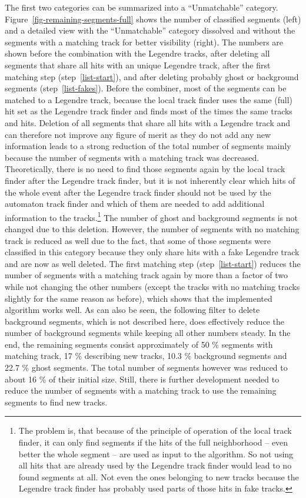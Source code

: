 The first two categories can be summarized into a ``Unmatchable'' category. Figure~\ref{fig-remaining-segments-full} shows the number of classified segments (left) and a detailed view with the ``Unmatchable'' category dissolved and without the segments with a matching track for better visibility (right). The numbers are shown before the combination with the Legendre tracks, after deleting all segments that share all hits with an unique Legendre track, after the first matching step (step~\ref{list-start}), and after deleting probably ghost or background segments (step~\ref{list-fakes}). Before the combiner, most of the segments can be matched to a Legendre track, because the local track finder uses the same (full) hit set as the Legendre track finder and finds most of the times the same tracks and hits. Deletion of all segments that share all hits with a Legendre track and can therefore not improve any figure of merit as they do not add any new information leads to a strong reduction of the total number of segments mainly because the number of segments with a matching track was decreased. Theoretically, there is no need to find those segments again by the local track finder after the Legendre track finder, but it is not inherently clear which hits of the whole event after the Legendre track finder should not be used by the automaton track finder and which of them are needed to add additional information to the tracks.\footnote{The problem is, that because of the principle of operation of the local track finder, it can only find segments if the hits of the full neighborhood -- even better the whole segment -- are used as input to the algorithm. So not using all hits that are already used by the Legendre track finder would lead to no found segments at all. Not even the ones belonging to new tracks because the Legendre track finder has probably used parts of those hits in fake tracks.} The number of ghost and background segments is not changed due to this deletion. However, the number of segments with no matching track is reduced as well due to the fact, that some of those segments were classified in this category because they only share hits with a fake Legendre track and are now as well deleted. The first matching step (step~\ref{list-start}) reduces the number of segments with a matching track again by more than a factor of two while not changing the other numbers (except the tracks with no matching tracks slightly for the same reason as before), which shows that the implemented algorithm works well. As can also be seen, the following filter to delete background segments, which is not described here, does effectively reduce the number of background segments while keeping all other numbers steady. In the end, the remaining segments consist approximately of 50 \% segments with matching track, 17 \% describing new tracks, 10.3 \% background segments and 22.7 \% ghost segments. The total number of segments however was reduced to about 16 \% of their initial size. Still, there is further development needed to reduce the number of segments with a matching track to use the remaining segments to find new tracks.

